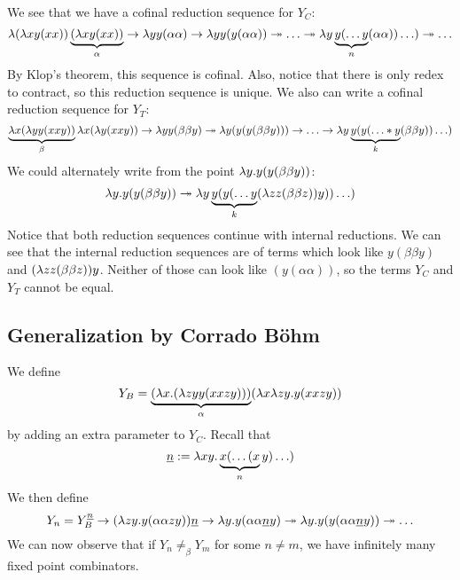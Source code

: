 We see that we have a cofinal reduction sequence for $Y_C$:
\begin{equation*}
  \lambda (\lambda x y(xx))\underbrace{(\lambda x y(xx))}_{\alpha} \rightarrow \lambda y y(\alpha \alpha) \rightarrow \lambda y y(y(\alpha\alpha)) \twoheadrightarrow \ldots \twoheadrightarrow \lambda y \underbrace{y(\ldots y}_{n}(\alpha\alpha)) \ldots ) \twoheadrightarrow \ldots
\end{equation*}
By Klop's theorem, this sequence is cofinal. Also, notice that there is only redex to contract, so this reduction sequence is unique. We also can write a cofinal reduction sequence for $Y_T$:
\begin{equation*}
  \underbrace{\lambda x (\lambda y y(xxy))}_{\beta} \lambda x (\lambda y(xxy)) \rightarrow \lambda y y(\beta\beta y) \twoheadrightarrow\lambda y (y (y (\beta\beta y))) \rightarrow \ldots \rightarrow \lambda y \underbrace{y(y(\ldots*y}_{k}(\beta\beta y))\ldots)
\end{equation*}
We could alternately write from the point $\lambda y . y(y(\beta\beta y))$:
\begin{equation*}
  \lambda y . y(y(\beta\beta y)) \twoheadrightarrow \lambda y \underbrace{y(y(\ldots y}_{k}(\lambda z z(\beta\beta z))y))\ldots)
\end{equation*}
Notice that both reduction sequences continue with internal reductions. We can see that the internal reduction sequences are of terms which look like $y(\beta\beta y)$ and $(\lambda z z(\beta\beta z))y$. Neither of those can look like $(y(\alpha\alpha))$, so the terms $Y_C$ and $Y_T$ cannot be equal.

\subsection{Generalization by Corrado B\"ohm}
We define
\begin{equation*}
  Y_B = \underbrace{(\lambda x . (\lambda zy y(xxzy)))}_{\alpha} (\lambda x \lambda zy . y(xxzy))
\end{equation*}
by adding an extra parameter to $Y_C$. Recall that 
\begin{equation*}
  \uline{n} := \l xy.\underbrace{x(\ldots(x}_{n}y)\ldots)
\end{equation*}
We then define
\begin{equation*}
  Y_n = Y_B^{\uline{n}} \rightarrow (\l zy . y(\alpha\alpha zy))\uline{n} \rightarrow \l y . y(\alpha \alpha \uline{n} y) \twoheadrightarrow \l y . y(y(\alpha\alpha\uline{n}y)) \twoheadrightarrow \ldots
\end{equation*}
We can now observe that if $Y_n \not=_\beta Y_m$ for some $n \not= m$, we have infinitely many fixed point combinators.\\

